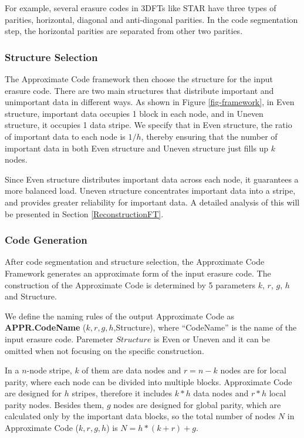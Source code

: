 \documentclass[sigconf]{acmart}
\begin{document}
For example, several erasure codes in 3DFTs like STAR have three types of parities, horizontal, diagonal and anti-diagonal parities. In the code segmentation step, the horizontal parities are separated from other two parities.

\subsubsection{Structure Selection}
The Approximate Code framework then choose the structure for the input erasure code.
There are two main structures that distribute important and unimportant data in different ways.
As shown in Figure \ref{fig-framework}, in Even structure, important data occupies 1 block in each node, and in Uneven structure, it occupies 1 data stripe.
We specify that in Even structure, the ratio of important data to each node is $1/h$, thereby ensuring that the number of important data in both Even structure and Uneven structure just fills up $k$ nodes.

Since Even structure distributes important data across each node, it guarantees a more balanced load. Uneven structure concentrates important data into a stripe, and provides greater reliability for important data. A detailed analysis of this will be presented in Section \ref{ReconstructionFT}.

\subsubsection{Code Generation}\label{code-gen}
After code segmentation and structure selection, the Approximate Code Framework generates an approximate form of the input erasure code.
The construction of the Approximate Code is determined by 5 parameters $k$, $r$, $g$, $h$ and Structure.

We define the naming rules of the output Approximate Code as \textbf{APPR.CodeName} ($k,r,g,h$,Structure), where ``CodeName'' is the name of the input erasure code. Paremeter $Structure$ is Even or Uneven and it can be omitted when not focusing on the specific construction.

In a $n$-node stripe, $k$ of them are data nodes and $r=n-k$ nodes are for local parity, where each node can be divided into multiple blocks.
Approximate Code are designed for $h$ stripes, therefore it includes $k*h$ data nodes and $r*h$ local parity nodes.
Besides them, $g$ nodes are designed for global parity, which are calculated only by the important data blocks, so the total number of nodes $N$ in Approximate Code ($k,r,g,h$) is
$N= h*(k+r) + g$.
\end{document}
